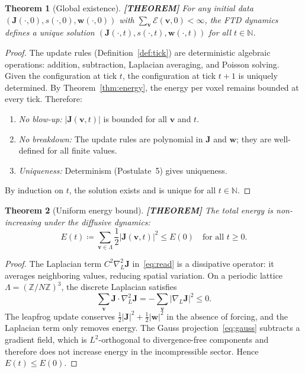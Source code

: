 \documentclass[11pt]{article}
\theoremstyle{tight}
\newtheorem{theorem}{Theorem}[section]
\theoremstyle{plainroman}
\newcommand{\Z}{\mathbb{Z}}
\newcommand{\N}{\mathbb{N}}
\begin{document}
\begin{theorem}[Global existence]\label{thm:existence}
\textbf{[THEOREM]}
For any initial data $(\mathbf J(\cdot,0),s(\cdot,0),\mathbf w(\cdot,0))$ with $\sum_{\mathbf v}\mathcal E(\mathbf v,0)<\infty$, the FTD dynamics defines a unique solution $(\mathbf J(\cdot,t),s(\cdot,t),\mathbf w(\cdot,t))$ for all $t\in\N$.
\end{theorem}
\begin{proof}
The update rules (Definition~\ref{def:tick}) are deterministic algebraic operations: addition, subtraction, Laplacian averaging, and Poisson solving.
Given the configuration at tick $t$, the configuration at tick $t+1$ is uniquely determined.
By Theorem~\ref{thm:energy}, the energy per voxel remains bounded at every tick.
Therefore:
\begin{enumerate}[nosep]
\item \emph{No blow-up:} $|\mathbf J(\mathbf v,t)|$ is bounded for all $\mathbf v$ and $t$.
\item \emph{No breakdown:} The update rules are polynomial in $\mathbf J$ and $\mathbf w$; they are well-defined for all finite values.
\item \emph{Uniqueness:} Determinism (Postulate~5) gives uniqueness.
\end{enumerate}
By induction on $t$, the solution exists and is unique for all $t\in\N$.
\end{proof}

\begin{theorem}[Uniform energy bound]\label{thm:uniform}
\textbf{[THEOREM]}
The total energy is non-increasing under the diffusive dynamics:
\[
E(t)\coloneqq\sum_{\mathbf v\in\Lambda}\frac{1}{2}|\mathbf J(\mathbf v,t)|^2 \le E(0) \quad \text{for all } t\ge 0.
\]
\end{theorem}
\begin{proof}
The Laplacian term $C^2\nabla_L^2\mathbf J$ in~\eqref{eq:read} is a dissipative operator: it averages neighboring values, reducing spatial variation.
On a periodic lattice $\Lambda=(\Z/N\Z)^3$, the discrete Laplacian satisfies
\[
\sum_{\mathbf v}\mathbf J\cdot\nabla_L^2\mathbf J=-\sum_{\mathbf v}|\nabla_L\mathbf J|^2\le 0.
\]
The leapfrog update conserves $\frac{1}{2}|\mathbf J|^2+\frac{1}{2}|\mathbf w|^2$ in the absence of forcing, and the Laplacian term only removes energy.
The Gauss projection~\eqref{eq:gauss} subtracts a gradient field, which is $L^2$-orthogonal to divergence-free components and therefore does not increase energy in the incompressible sector.
Hence $E(t)\le E(0)$.
\end{proof}
\end{document}
